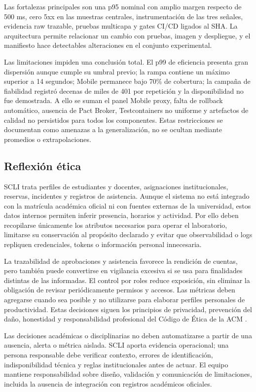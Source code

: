 Las fortalezas principales son una p95 nominal con amplio margen respecto de
500 ms, cero 5xx en las muestras centrales, instrumentación de las tres señales,
evidencia raw trazable, pruebas multicapa y gates CI/CD ligados al SHA. La
arquitectura permite relacionar un cambio con pruebas, imagen y despliegue, y el
manifiesto hace detectables alteraciones en el conjunto experimental.

Las limitaciones impiden una conclusión total. El p99 de eficiencia presenta
gran dispersión aunque cumple su umbral previo; la rampa contiene un máximo
superior a 14 segundos; Mobile permanece bajo 70\% de cobertura; la campaña de
fiabilidad registró decenas de miles de 401 por repetición y la disponibilidad
no fue demostrada. A ello se suman el panel Mobile proxy, falta de rollback automático,
ausencia de Pact Broker, Testcontainers no uniforme y artefactos de calidad no
persistidos para todos los componentes. Estas restricciones se documentan como
amenazas a la generalización, no se ocultan mediante promedios o extrapolaciones.

\subsection{Reflexión ética}
\label{subsec:reflexion-etica}

SCLI trata perfiles de estudiantes y docentes, asignaciones institucionales,
reservas, incidentes y registros de asistencia. Aunque el sistema no está
integrado con la matrícula académica oficial ni con fuentes externas de la
universidad, estos datos internos permiten inferir presencia, horarios y
actividad. Por ello deben recopilarse únicamente los atributos necesarios para
operar el laboratorio, limitarse su conservación al propósito declarado y
evitar que observabilidad o logs repliquen credenciales, tokens o información
personal innecesaria.

La trazabilidad de aprobaciones y asistencia favorece la rendición de cuentas,
pero también puede convertirse en vigilancia excesiva si se usa para finalidades
distintas de las informadas. El control por roles reduce exposición, sin
eliminar la obligación de revisar periódicamente permisos y accesos. Las
métricas deben agregarse cuando sea posible y no utilizarse para elaborar
perfiles personales de productividad. Estas decisiones siguen los principios
de privacidad, prevención del daño, honestidad y responsabilidad profesional
del Código de Ética de la ACM \cite{acm2018code}.

Las decisiones académicas o disciplinarias no deben automatizarse a partir de
una ausencia, alerta o métrica aislada. SCLI aporta evidencia operacional; una
persona responsable debe verificar contexto, errores de identificación,
indisponibilidad técnica y reglas institucionales antes de actuar. El equipo
mantiene responsabilidad sobre diseño, validación y comunicación de
limitaciones, incluida la ausencia de integración con registros académicos
oficiales.

